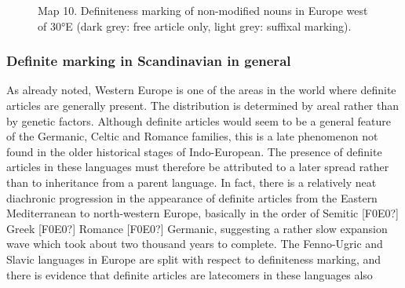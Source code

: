 \clearpage%


\begin{figure}[h]
\centering
\begin{minipage}{5.58403in}
\label{bkm:Ref224379647}Map 10. Definiteness marking of non-modified nouns in Europe west of 30°E (dark grey: free article only, light grey: suffixal marking).
\end{minipage}
\end{figure}
\clearpage\subsubsection[Definite marking in Scandinavian in general]{\rmfamily Definite marking in Scandinavian in general}
\label{bkm:Ref224380083}%
As already noted, Western Europe is one of the areas in the world where definite articles are generally present. The distribution is determined by areal rather than by genetic factors. Although definite articles would seem to be a general feature of the Germanic, Celtic and Romance families, this is a late phenomenon not found in the older historical stages of Indo-European. The presence of definite articles in these languages must therefore be attributed to a later spread rather than to inheritance from a parent language. In fact, there is a relatively neat diachronic progression in the appearance of definite articles from the Eastern Mediterranean to north-western Europe, basically in the order of Semitic [F0E0?] Greek [F0E0?] Romance [F0E0?] Germanic, suggesting a rather slow expansion wave which took about two thousand years to complete. The Fenno-Ugric and Slavic languages in Europe are split with respect to definiteness marking, and there is evidence that definite articles are latecomers in these languages also

